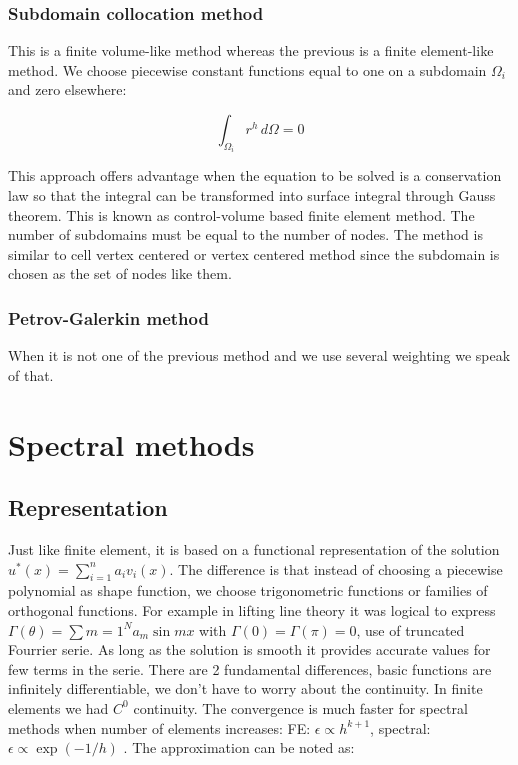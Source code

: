 \subsubsection{Subdomain collocation method}
This is a finite volume-like method whereas the previous is a finite element-like method. We choose piecewise constant functions equal to one on a subdomain $\Omega _i$ and zero elsewhere: 

\begin{equation}
\int _{\Omega  _i} r^h \, d\Omega = 0
\end{equation}

This approach offers advantage when the equation to be solved is a conservation law so that the integral can be transformed into surface integral through Gauss theorem. This is known as control-volume based finite element method. The number of subdomains must be equal to the number of nodes. The method is similar to cell vertex centered or vertex centered method since the subdomain is chosen as the set of nodes like them.

\subsubsection{Petrov-Galerkin method}
When it is not one of the previous method and we use several weighting we speak of that. 

\section{Spectral methods}
\subsection{Representation}
Just like finite element, it is based on a functional representation of the solution $u^* (x) = \sum _{i=1}^n a_i v_i (x)$. The difference is that instead of choosing a piecewise polynomial as shape function, we choose trigonometric functions or families of orthogonal functions. For example in lifting line theory it was logical to express $\Gamma (\theta) = \sum {m=1}^N a_m \sin mx$ with $\Gamma (0) = \Gamma (\pi) = 0$, use of truncated Fourrier serie.  As long as the solution is smooth it provides accurate values for few terms in the serie. There are 2 fundamental differences, basic functions are infinitely differentiable, we don’t have to worry about the continuity. In finite elements we had $C^0$ continuity. The convergence is much faster for spectral methods when number of elements increases: FE: $\epsilon \propto h^{k+1}$, spectral: $\epsilon \propto \exp(-1/h)$ . The approximation can be noted as:

